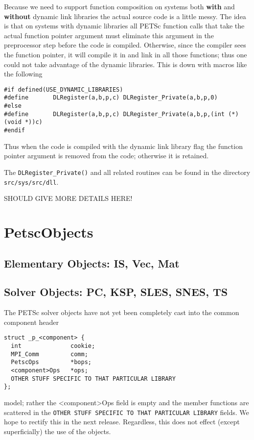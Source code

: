  Because we need to support function composition on systems both {\bf with} and {\bf without} 
dynamic link libraries the actual source code is a little messy. The idea is that
on systems with dynamic libraries all PETSc function calls that take the actual 
function pointer argument must eliminate this argument in the preprocessor step before 
the code is compiled. Otherwise, since the compiler sees the function pointer, it will 
compile it in and link in all those functions; thus one could not take advantage of the
dynamic libraries. This is down with macros like the following
\begin{verbatim}
#if defined(USE_DYNAMIC_LIBRARIES)
#define       DLRegister(a,b,p,c) DLRegister_Private(a,b,p,0)
#else
#define       DLRegister(a,b,p,c) DLRegister_Private(a,b,p,(int (*)(void *))c)
#endif
\end{verbatim}
Thus when the code is compiled with the dynamic link library flag the function pointer 
argument is removed from the code; otherwise it is retained. 

The {\tt DLRegister\_Private()} and all related routines can be found in the directory
{\tt src/sys/src/dll}.

SHOULD GIVE MORE DETAILS HERE!

\chapter{PetscObjects}

\section{Elementary Objects: IS, Vec, Mat}

\section{Solver Objects: PC, KSP, SLES, SNES, TS}

The PETSc solver objects have not yet been completely cast into the common component 
header 
\begin{verbatim}
struct _p_<component> {
  int              cookie;                                  
  MPI_Comm         comm;                                    
  PetscOps         *bops;                                   
  <component>Ops   *ops;       
  OTHER STUFF SPECIFIC TO THAT PARTICULAR LIBRARY
};
\end{verbatim}
model; rather the <component>Ops field is empty and the member functions
are scattered in the {\tt OTHER STUFF SPECIFIC TO THAT PARTICULAR LIBRARY}
fields. We hope to rectify this in the next release. Regardless, this does not
effect (except superficially) the use of the objects.


